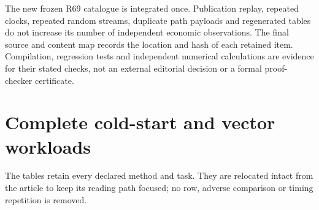 The new frozen R69 catalogue is integrated once. Publication replay, repeated clocks, repeated random streams, duplicate path payloads and regenerated tables do not increase its number of independent economic observations. The final source and content map records the location and hash of each retained item. Compilation, regression tests and independent numerical calculations are evidence for their stated checks, not an external editorial decision or a formal proof-checker certificate.

\section{Complete cold-start and vector workloads}\label{supp:workloads70}


The tables retain every declared method and task. They are relocated intact from the article to keep its reading path focused; no row, adverse comparison or timing repetition is removed.
